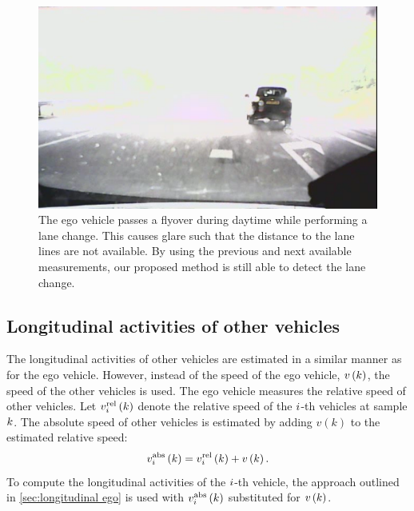\begin{figure}
	\centering
	\includegraphics[width=\linewidth]{figures/glare}
	\caption{\cstarta The ego vehicle passes a flyover during daytime while performing a lane change. This causes glare such that the distance to the lane lines are not available. By using the previous and next available measurements, our proposed method is still able to detect the lane change.\cenda}
	\label{fig:glare}
\end{figure}



\subsection{Longitudinal activities of other vehicles}
\label{sec:longitudinal other vehicles}

The longitudinal activities of other vehicles are estimated in a similar manner as for the ego vehicle. However, instead of the speed of the ego vehicle, $v\left(k\right)$, the speed of the other vehicles is used. The ego vehicle measures the relative speed of other vehicles. Let $v_{i}^{\mathrm{rel}}\left(k\right)$ denote the relative speed of the $i$-th vehicles at sample $k$. The absolute speed of other vehicles is estimated by adding $v(k)$ to the estimated relative speed:
\begin{equation}
	v_{i}^{\mathrm{abs}}\left(k\right) = v_{i}^{\mathrm{rel}}\left(k\right) + v\left(k\right).
\end{equation}
To compute the longitudinal activities of the $i$-th vehicle, the approach outlined in \cref{sec:longitudinal ego} is used with $v_{i}^{\mathrm{abs}}\left(k\right)$ substituted for $v\left(k\right)$. 




